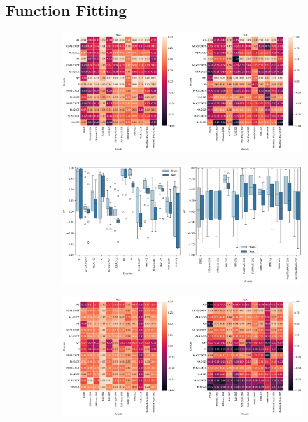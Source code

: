 \documentclass[journal=jacsat,manuscript=article]{achemso}
\begin{document}
\subsection{Function Fitting}

\begin{figure}[H]
	\centering
	\begin{subfigure}[b]{0.49\textwidth}
		\centering
		\includegraphics[width=\textwidth]{../images/Function_Fitting/fivequbit/linear_heatplots.png}
		\caption{}
		\label{fig:linear_heatplots}
	\end{subfigure}
	\hfill
	\begin{subfigure}[b]{0.49\textwidth}
		\centering
		\includegraphics[width=\textwidth]{../images/Function_Fitting/fivequbit/linear_boxplots.png}
		\caption{}
		\label{fig:linear_boxplots}
	\end{subfigure}
	\hfill	
	\begin{subfigure}[b]{0.49\textwidth}
		\centering
		\includegraphics[width=\textwidth]{../images/Function_Fitting/fivequbit/quadratic_heatplots.png}

\end{subfigure}
\end{figure}
\end{document}
